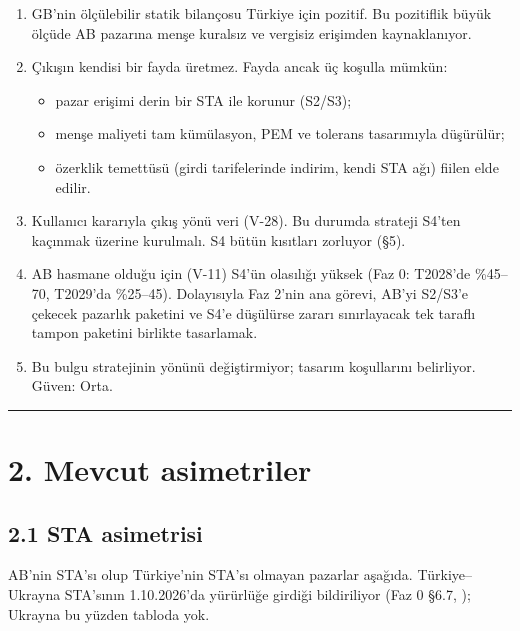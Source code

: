 \begin{enumerate}
\def\labelenumi{\arabic{enumi}.}
\tightlist
\item
  GB'nin ölçülebilir statik bilançosu Türkiye için pozitif. Bu pozitiflik büyük ölçüde AB pazarına menşe kuralsız ve vergisiz erişimden kaynaklanıyor.
\item
  Çıkışın kendisi bir fayda üretmez. Fayda ancak üç koşulla mümkün:

  \begin{itemize}
  \tightlist
  \item
    pazar erişimi derin bir STA ile korunur (S2/S3);
  \item
    menşe maliyeti tam kümülasyon, PEM ve tolerans tasarımıyla düşürülür;
  \item
    özerklik temettüsü (girdi tarifelerinde indirim, kendi STA ağı) fiilen elde edilir.
  \end{itemize}
\item
  Kullanıcı kararıyla çıkış yönü veri (V-28). Bu durumda strateji S4'ten kaçınmak üzerine kurulmalı. S4 bütün kısıtları zorluyor (§5).
\item
  AB hasmane olduğu için (V-11) S4'ün olasılığı yüksek (Faz 0: T2028'de \%45--70, T2029'da \%25--45). Dolayısıyla Faz 2'nin ana görevi, AB'yi S2/S3'e çekecek pazarlık paketini ve S4'e düşülürse zararı sınırlayacak tek taraflı tampon paketini birlikte tasarlamak.
\item
  Bu bulgu stratejinin yönünü değiştirmiyor; tasarım koşullarını belirliyor. \etiketH{} Güven: Orta.
\end{enumerate}

\begin{center}\rule{0.5\linewidth}{0.5pt}\end{center}

\hypertarget{01_teshis-2-mevcut-asimetriler}{%
\section{2. Mevcut asimetriler}\label{01_teshis-2-mevcut-asimetriler}}

\hypertarget{01_teshis-21-sta-asimetrisi}{%
\subsection{2.1 STA asimetrisi}\label{01_teshis-21-sta-asimetrisi}}

AB'nin STA'sı olup Türkiye'nin STA'sı olmayan pazarlar aşağıda. Türkiye--Ukrayna STA'sının 1.10.2026'da yürürlüğe girdiği bildiriliyor (Faz 0 §6.7, \etiketD{}); Ukrayna bu yüzden tabloda yok.


